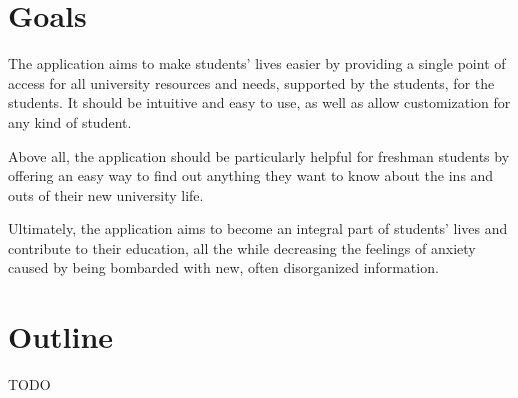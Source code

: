\section{Goals} \label{1:goals}

    The application aims to make students' lives easier by providing a single point of access for all university resources and needs, supported by the students, for the students. It should be intuitive and easy to use, as well as allow customization for any kind of student.
    
    Above all, the application should be particularly helpful for freshman students by offering an easy way to find out anything they want to know about the ins and outs of their new university life.
    
    Ultimately, the application aims to become an integral part of students' lives and contribute to their education, all the while decreasing the feelings of anxiety caused by being bombarded with new, often disorganized information.

\section{Outline} \label{1:outline}
    TODO